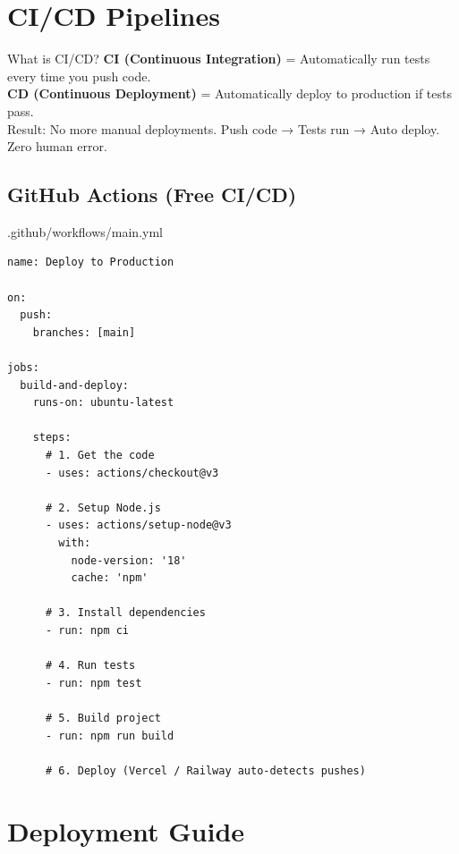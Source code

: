 \documentclass[12pt,a4paper]{article}
\begin{document}
\newpage

\section{CI/CD Pipelines}

\begin{infobox}{What is CI/CD?}
\textbf{CI (Continuous Integration)} = Automatically run tests every time you push code.\\[0.2cm]
\textbf{CD (Continuous Deployment)} = Automatically deploy to production if tests pass.\\[0.2cm]
Result: No more manual deployments. Push code → Tests run → Auto deploy. Zero human error.
\end{infobox}

\subsection{GitHub Actions (Free CI/CD)}

\begin{codebox}{.github/workflows/main.yml}
\begin{lstlisting}
name: Deploy to Production

on:
  push:
    branches: [main]

jobs:
  build-and-deploy:
    runs-on: ubuntu-latest

    steps:
      # 1. Get the code
      - uses: actions/checkout@v3

      # 2. Setup Node.js
      - uses: actions/setup-node@v3
        with:
          node-version: '18'
          cache: 'npm'

      # 3. Install dependencies
      - run: npm ci

      # 4. Run tests
      - run: npm test

      # 5. Build project
      - run: npm run build

      # 6. Deploy (Vercel / Railway auto-detects pushes)
\end{lstlisting}
\end{codebox}

\newpage

\section{Deployment Guide}
\end{document}
